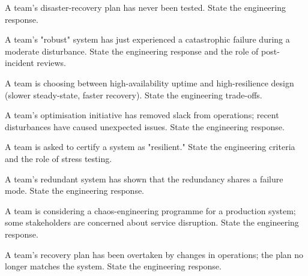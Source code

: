\begin{exercise}
A team's disaster-recovery plan has never been tested. State the engineering response.
\end{exercise}

\begin{exercise}
A team's "robust" system has just experienced a catastrophic failure during a moderate disturbance. State the engineering response and the role of post-incident reviews.
\end{exercise}

\begin{exercise}
A team is choosing between high-availability uptime and high-resilience design (slower steady-state, faster recovery). State the engineering trade-offs.
\end{exercise}

\begin{exercise}
A team's optimisation initiative has removed slack from operations; recent disturbances have caused unexpected issues. State the engineering response.
\end{exercise}

\begin{exercise}
A team is asked to certify a system as "resilient." State the engineering criteria and the role of stress testing.
\end{exercise}

\begin{exercise}
A team's redundant system has shown that the redundancy shares a failure mode. State the engineering response.
\end{exercise}

\begin{exercise}
A team is considering a chaos-engineering programme for a production system; some stakeholders are concerned about service disruption. State the engineering response.
\end{exercise}

\begin{exercise}
A team's recovery plan has been overtaken by changes in operations; the plan no longer matches the system. State the engineering response.
\end{exercise}
